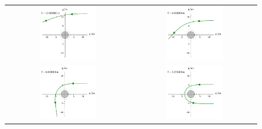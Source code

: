 \begin{figure}
\begin{tabular}{cc}
\includegraphics[width=0.48\textwidth]{ges_null_b_12_000000.pdf} &
\includegraphics[width=0.48\textwidth]{ges_null_b_8_000000.pdf} \\
\includegraphics[width=0.48\textwidth]{ges_null_b_6_000000.pdf} &
\includegraphics[width=0.48\textwidth]{ges_null_b_5_355000.pdf}

\end{tabular}
\end{figure}
